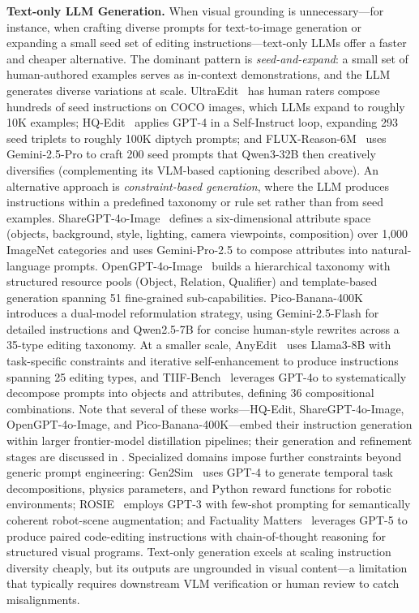 \textbf{Text-only LLM Generation.}
When visual grounding is unnecessary---for instance, when crafting diverse prompts for text-to-image generation or expanding a small seed set of editing instructions---text-only LLMs offer a faster and cheaper alternative. The dominant pattern is \emph{seed-and-expand}: a small set of human-authored examples serves as in-context demonstrations, and the LLM generates diverse variations at scale. UltraEdit~\citep{zhao2024ultraedit} has human raters compose hundreds of seed instructions on COCO images, which LLMs expand to roughly 10K examples; HQ-Edit~\citep{hui2024hq} applies GPT-4 in a Self-Instruct loop, expanding 293 seed triplets to roughly 100K diptych prompts; and FLUX-Reason-6M~\citep{fang2025flux} uses Gemini-2.5-Pro to craft 200 seed prompts that Qwen3-32B then creatively diversifies (complementing its VLM-based captioning described above). An alternative approach is \emph{constraint-based generation}, where the LLM produces instructions within a predefined taxonomy or rule set rather than from seed examples. ShareGPT-4o-Image~\citep{chen2025sharegpt} defines a six-dimensional attribute space (objects, background, style, lighting, camera viewpoints, composition) over 1,000 ImageNet categories and uses Gemini-Pro-2.5 to compose attributes into natural-language prompts. OpenGPT-4o-Image~\citep{chen2025opengpt} builds a hierarchical taxonomy with structured resource pools (Object, Relation, Qualifier) and template-based generation spanning 51 fine-grained sub-capabilities. Pico-Banana-400K~\citep{qian2025pico} introduces a dual-model reformulation strategy, using Gemini-2.5-Flash for detailed instructions and Qwen2.5-7B for concise human-style rewrites across a 35-type editing taxonomy. At a smaller scale, AnyEdit~\citep{yu2025anyedit} uses Llama3-8B with task-specific constraints and iterative self-enhancement to produce instructions spanning 25 editing types, and TIIF-Bench~\citep{wei2025tiif} leverages GPT-4o to systematically decompose prompts into objects and attributes, defining 36 compositional combinations. Note that several of these works---HQ-Edit, ShareGPT-4o-Image, OpenGPT-4o-Image, and Pico-Banana-400K---embed their instruction generation within larger frontier-model distillation pipelines; their generation and refinement stages are discussed in . Specialized domains impose further constraints beyond generic prompt engineering: Gen2Sim~\citep{katara2024gen2sim} uses GPT-4 to generate temporal task decompositions, physics parameters, and Python reward functions for robotic environments; ROSIE~\citep{yu2023scaling} employs GPT-3 with few-shot prompting for semantically coherent robot-scene augmentation; and Factuality Matters~\citep{zhuo2025factuality} leverages GPT-5 to produce paired code-editing instructions with chain-of-thought reasoning for structured visual programs. Text-only generation excels at scaling instruction diversity cheaply, but its outputs are ungrounded in visual content---a limitation that typically requires downstream VLM verification or human review to catch misalignments.

